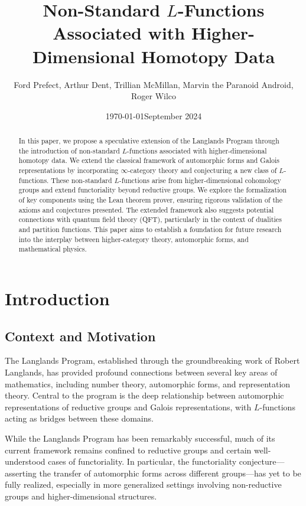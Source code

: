 \documentclass{article}
\title{Non-Standard $L$-Functions Associated with Higher-Dimensional Homotopy Data}
\author{Ford Prefect, Arthur Dent, Trillian McMillan, Marvin the Paranoid Android, Roger Wilco}
\affil{Min Planck Institute for Unauthorized Quantum Physics}
\date{\today}
\date{September 2024}
\theoremstyle{remark}
\begin{document}
\maketitle

\begin{abstract}
    In this paper, we propose a speculative extension of the Langlands Program through the introduction of non-standard $L$-functions associated with higher-dimensional homotopy data. We extend the classical framework of automorphic forms and Galois representations by incorporating $\infty$-category theory and conjecturing a new class of $L$-functions. These non-standard $L$-functions arise from higher-dimensional cohomology groups and extend functoriality beyond reductive groups. We explore the formalization of key components using the Lean theorem prover, ensuring rigorous validation of the axioms and conjectures presented. The extended framework also suggests potential connections with quantum field theory (QFT), particularly in the context of dualities and partition functions. This paper aims to establish a foundation for future research into the interplay between higher-category theory, automorphic forms, and mathematical physics.
\end{abstract}
    
\section{Introduction}
    
\subsection{Context and Motivation}
    
The Langlands Program, established through the groundbreaking work of Robert Langlands, has provided profound connections between several key areas of mathematics, including number theory, automorphic forms, and representation theory. Central to the program is the deep relationship between automorphic representations of reductive groups and Galois representations, with $L$-functions acting as bridges between these domains.
    
While the Langlands Program has been remarkably successful, much of its current framework remains confined to reductive groups and certain well-understood cases of functoriality. In particular, the functoriality conjecture—asserting the transfer of automorphic forms across different groups—has yet to be fully realized, especially in more generalized settings involving non-reductive groups and higher-dimensional structures.
    
\end{document}
